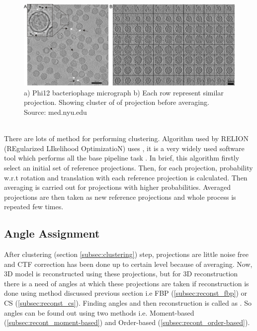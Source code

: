 \documentclass{report}
\begin{document}
\begin{figure}[h]
\includegraphics[width=1\textwidth]{phi-12-slices_clustering}
\centering
\captionsetup{justification=centering}
\caption[Caption for LOF]{a) Phi12 bacteriophage micrograph b) Each row represent similar projection. Showing cluster of of projection before averaging.\\Source: med.nyu.edu \protect\footnotemark}
\label{fig:clustering}
\end{figure}

\noindent\\
There are lots of method for performing clustering. Algorithm used by RELION (REgularized LIkelihood OptimizatioN) uses , it is a very widely used software tool which performs all the base pipeline task \cite{scheres2012relion}. In brief, this algorithm firstly select an initial set of reference projections. Then, for each projection, probability w.r.t rotation and translation with each reference projection is calculated. Then averaging is carried out for projections with higher probabilities. Averaged projections are then taken as new reference projections and whole process is repeated few times.

\subsection{Angle Assignment}
After clustering (section \ref{subsec:clustering}) step, projections are little noise free and CTF correction has been done up to certain level because of averaging. Now, 3D model is reconstructed using these projections, but for 3D reconstruction there is a need of angles at which these projections are taken if reconstruction is done using method discussed previous section i.e FBP (\ref{subsec:reconst_fbp}) or CS (\ref{subsec:reconst_cs}). Finding angles and then reconstruction is called as . So angles can be found out using  two methods i.e. Moment-based (\ref{subsec:recont_moment-based}) and Order-based (\ref{subsec:recont_order-based}).
\end{document}
